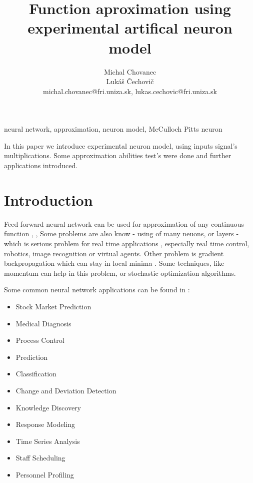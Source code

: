 \documentclass[10pt,a5paper]{article}
\begin{document}
\title{Function aproximation using experimental artifical neuron model}
\author{Michal Chovanec\\ Lukáš Čechovič \\
michal.chovanec@fri.uniza.sk, lukas.cechovic@fri.uniza.sk}
\date{}
\maketitle
\thispagestyle{empty}


 neural network, approximation, neuron model, McCulloch Pitts neuron

 In this paper we introduce experimental neuron model,
using inputs signal's multiplications. Some approximation abilities test's were done
and further applications introduced.

\section{Introduction}

Feed forward neural network can be used for approximation of any continuous function \cite{bib:Approximation_1}, \cite{bib:Approximation_2}, \cite{bib:Approximation_3}
Some problems are also know \cite{bib:Approximation_problem_1} - using of many neuons, or layers -
which is serious problem for real time applications \cite{bib:Approximation_problem_2}, especially
real time control, robotics, image recognition or virtual agents. Other problem is gradient backpropagation
which can stay in local minima \cite{bib:Backpopagation_01}. Some techniques, like momentum can help in this problem,
or stochastic optimization algorithms.

Some common neural network applications \cite{bib:NN_Applications_01} can be found in :

\begin{itemize}
  \item Stock Market Prediction
  \item Medical Diagnosis
  \item Process Control
  \item Prediction
  \item Classification
  \item Change and Deviation Detection
  \item Knowledge Discovery
  \item Response Modeling
  \item Time Series Analysis
  \item Staff Scheduling
  \item Personnel Profiling
\end{itemize}
\end{document}
